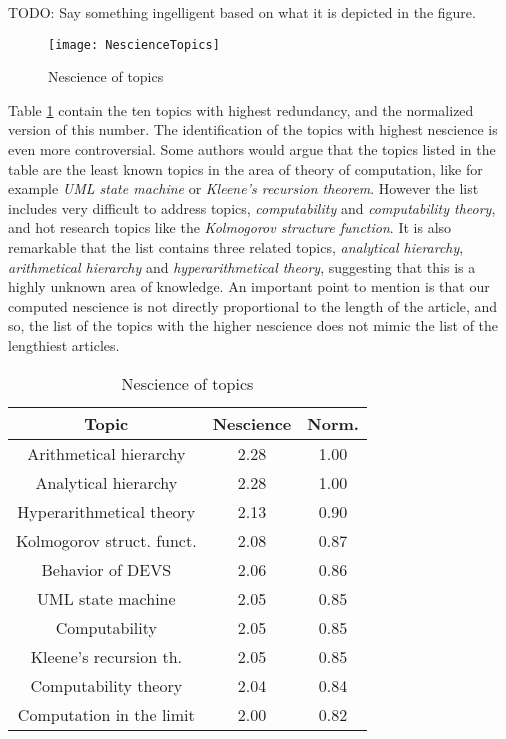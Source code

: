 {\color{red} TODO: Say something ingelligent based on what it is depicted in the figure.}

\begin{figure}[h]
\centering\texttt{[image: NescienceTopics]}
\caption{\label{fig:Nescience-of-Topics}Nescience of topics}
\end{figure}

{\color{red} Table \ref{tab:Nescience-of-topics} contain the ten topics with highest redundancy, and the normalized version of this number. The identification of the topics with highest nescience is even more controversial. Some authors would argue that the topics listed in the table are the least known topics in the area of theory of computation, like for example \emph{UML state machine} or \emph{Kleene's recursion theorem}. However the list includes very difficult to address topics, \emph{computability} and \emph{computability theory}, and hot research topics like the \emph{Kolmogorov structure function}. It is also remarkable that the list contains three related topics, \emph{analytical hierarchy}, \emph{arithmetical hierarchy} and \emph{hyperarithmetical theory}, suggesting that this is a highly unknown area of knowledge. An important point to mention is that our computed nescience is not directly proportional to the length of the article, and so, the list of the topics with the higher nescience does not mimic the list of the lengthiest articles.}

\begin{table}
\begin{centering}
\begin{tabular}{|c|c|c|}
\hline 
Topic & Nescience & Norm.\tabularnewline
\hline 
\hline 
Arithmetical hierarchy & 2.28 & 1.00\tabularnewline
\hline 
Analytical hierarchy & 2.28 & 1.00\tabularnewline
\hline 
Hyperarithmetical theory & 2.13 & 0.90\tabularnewline
\hline 
Kolmogorov struct. funct. & 2.08 & 0.87\tabularnewline
\hline 
Behavior of DEVS & 2.06 & 0.86\tabularnewline
\hline 
UML state machine & 2.05 & 0.85\tabularnewline
\hline 
Computability & 2.05 & 0.85\tabularnewline
\hline 
Kleene's recursion th. & 2.05 & 0.85\tabularnewline
\hline 
Computability theory & 2.04 & 0.84\tabularnewline
\hline 
Computation in the limit & 2.00 & 0.82\tabularnewline
\hline 
\end{tabular}
\par\end{centering}

\caption{\label{tab:Nescience-of-topics}Nescience of topics}
\end{table}

